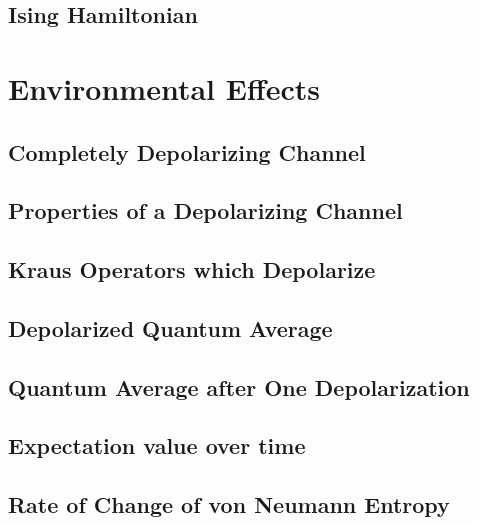 \documentclass[12pt]{article}
\begin{document}
\subsection{Ising Hamiltonian}


\section{Environmental Effects}

\subsection{Completely Depolarizing Channel}

\subsection{Properties of a Depolarizing Channel}

\subsection{Kraus Operators which Depolarize}

\subsection{Depolarized Quantum Average}

\subsection{Quantum Average after One Depolarization}

\subsection{Expectation value over time}

\subsection{Rate of Change of von Neumann Entropy}
\end{document}
